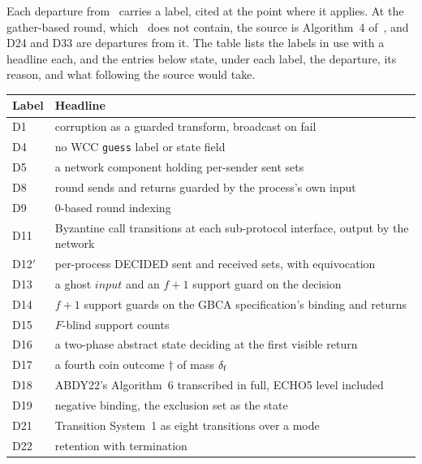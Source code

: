 Each departure from~\cite{LeslieBP} carries a label, cited at the point where it applies.
At the gather-based round, which~\cite{LeslieBP} does not contain, the source is Algorithm~4 of~\cite{AFW25}, and D24 and D33 are departures from it.
The table lists the labels in use with a headline each, and the entries below state, under each label, the departure, its reason, and what following the source would take.
\begin{center}
\footnotesize \setlength{\tabcolsep}{4pt}
\begin{tabular}{lp{12cm}}
\hline
Label & Headline \\
\hline
D1 & corruption as a guarded transform, broadcast on fail \\
D4 & no WCC \texttt{guess} label or state field \\
D5 & a network component holding per-sender sent sets \\
D8 & round sends and returns guarded by the process's own input \\
D9 & $0$-based round indexing \\
D11 & Byzantine call transitions at each sub-protocol interface, output by the network \\
D12$'$ & per-process DECIDED sent and received sets, with equivocation \\
D13 & a ghost $input$ and an $f+1$ support guard on the decision \\
D14 & $f+1$ support guards on the GBCA specification's binding and returns \\
D15 & $F$-blind support counts \\
D16 & a two-phase abstract state deciding at the first visible return \\
D17 & a fourth coin outcome $\dagger$ of mass $\delta_{\mathrm{f}}$ \\
D18 & ABDY22's Algorithm~6 transcribed in full, ECHO5 level included \\
D19 & negative binding, the exclusion set as the state \\
D21 & Transition System~1 as eight transitions over a mode \\
D22 & retention with termination \\

\end{tabular}
\end{center}
